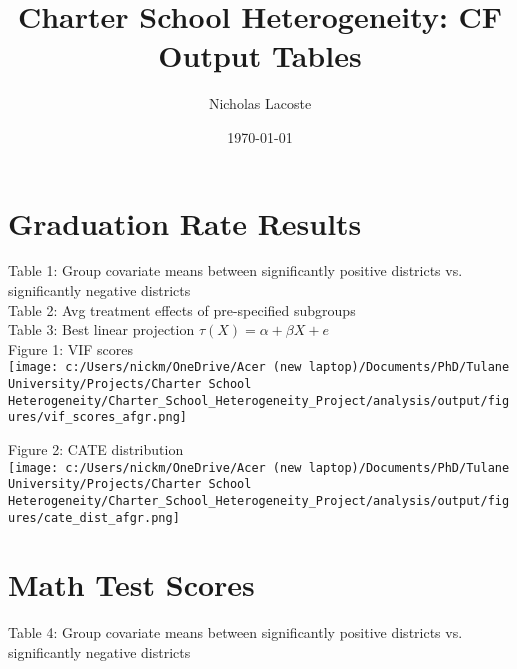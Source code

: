 \documentclass{article} %
\title{Charter School Heterogeneity: CF Output Tables} %
\author{Nicholas Lacoste} %
\date{\today} %
\begin{document}
    \maketitle %

\section{Graduation Rate Results}

Table 1: Group covariate means between significantly positive districts vs. significantly negative districts\\



Table 2: Avg treatment effects of pre-specified subgroups\\


Table 3: Best linear projection $\tau(X) = \alpha + \beta X + e$\\


Figure 1: VIF scores\\
\texttt{[image: c:/Users/nickm/OneDrive/Acer (new laptop)/Documents/PhD/Tulane University/Projects/Charter School Heterogeneity/Charter\_School\_Heterogeneity\_Project/analysis/output/figures/vif\_scores\_afgr.png]}
	
Figure 2: CATE distribution\\
\texttt{[image: c:/Users/nickm/OneDrive/Acer (new laptop)/Documents/PhD/Tulane University/Projects/Charter School Heterogeneity/Charter\_School\_Heterogeneity\_Project/analysis/output/figures/cate\_dist\_afgr.png]}


\section{Math Test Scores}

Table 4: Group covariate means between significantly positive districts vs. significantly negative districts\\

\end{document}
